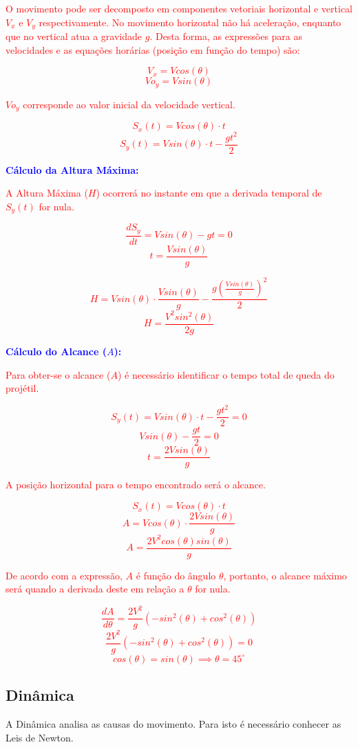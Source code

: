 \documentclass[
    12pt, %
    openright,
    twoside, %
    a4paper, %
    article,
    english,brazil %
]{abntex2}
\begin{document}
\textcolor{red}{O movimento pode ser decomposto em componentes vetoriais horizontal e vertical $V_x$ e $V_y$ respectivamente. No movimento horizontal não há aceleração, enquanto que no vertical atua a gravidade $g$. Desta forma, as expressões para as velocidades e as equações horárias (posição em função do tempo) são:}

\textcolor{red}{
    $$V_x = V cos(\theta)$$
    $$Vo_y = V sin(\theta)$$
}

\textcolor{red}{$Vo_y$ corresponde ao valor inicial da velocidade vertical.}

\textcolor{red}{
    $$S_x(t) = V cos(\theta) \cdot t$$
    $$S_y(t) = V sin(\theta) \cdot t - \frac{gt^2}{2}$$
}

\textcolor{blue}{\textbf{Cálculo da Altura Máxima:}}

\textcolor{red}{A Altura Máxima ($H$) ocorrerá no instante em que a derivada temporal de $S_y(t)$ for nula.}

\textcolor{red}{
    $$\frac{dS_y}{dt} = V sin(\theta) - gt = 0$$
    $$t = \frac{V sin(\theta)}{g}$$
}

\textcolor{red}{
    $$H = V sin(\theta) \cdot \frac{V sin(\theta)}{g} - \frac{g (\frac{V sin(\theta)}{g})^2}{2}$$
    $$H = \frac{V^2 sin^2(\theta)}{2g}$$
}

\textcolor{blue}{\textbf{Cálculo do Alcance ($A$):}}

\textcolor{red}{Para obter-se o alcance ($A$) é necessário identificar o tempo total de queda do projétil.}

\textcolor{red}{
    $$S_y(t) = V sin(\theta) \cdot t - \frac{gt^2}{2} = 0$$
    $$V sin(\theta) - \frac{gt}{2} = 0$$
    $$t = \frac{2V sin(\theta)}{g}$$
}

\textcolor{red}{A posição horizontal para o tempo encontrado será o alcance.}

\textcolor{red}{
    $$S_x(t) = V cos(\theta) \cdot t$$
    $$A = V cos(\theta) \cdot \frac{2V sin(\theta)}{g}$$
    $$A = \frac{2V^2 cos(\theta)sin(\theta)}{g}$$
}

\textcolor{red}{De acordo com a expressão, $A$ é função do ângulo $\theta$, portanto, o alcance máximo será quando a derivada deste em relação a $\theta$ for nula.}

\textcolor{red}{
    $$\frac{dA}{d\theta} = \frac{2V^2}{g}(-sin^2(\theta) + cos^2(\theta))$$
    $$\frac{2V^2}{g}(-sin^2(\theta) + cos^2(\theta)) = 0$$
    $$cos(\theta) = sin(\theta) \implies \theta = 45^\circ$$
}

\subsection{Dinâmica}

A Dinâmica analisa as causas do movimento. Para isto é necessário conhecer as Leis de Newton.
\end{document}
